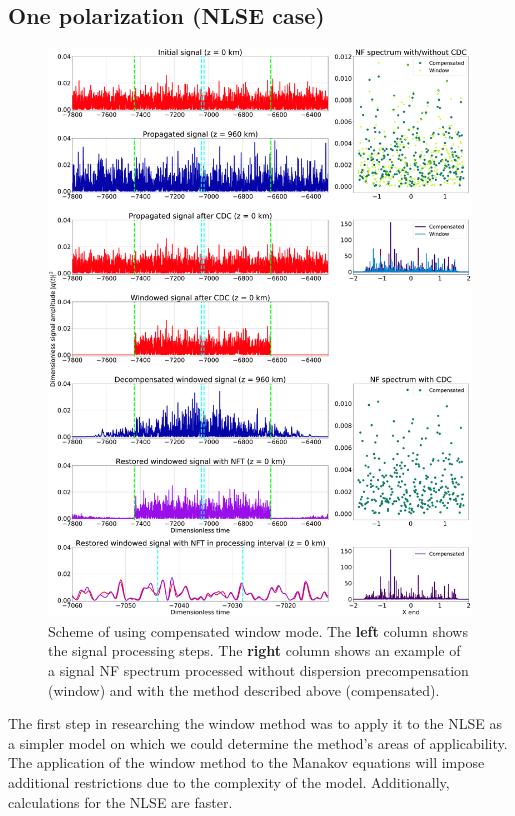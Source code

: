 \subsection{One polarization (NLSE case)}

\begin{figure}[tbp]
    \centering
        \includegraphics[width=0.95\linewidth]{images/window/nft_windowed_cdc_scheme.pdf}
    \caption{Scheme of using compensated window mode. The \textbf{left} column shows the signal processing steps. The \textbf{right} column shows an example of a signal NF spectrum processed without dispersion precompensation (window) and with the method described above (compensated).}
    \label{fig:nft_windowed_scheme}
\end{figure}

The first step in researching the window method was to apply it to the NLSE as a simpler model on which we could determine the method's areas of applicability. The application of the window method to the Manakov equations will impose additional restrictions due to the complexity of the model. Additionally, calculations for the NLSE are faster.


